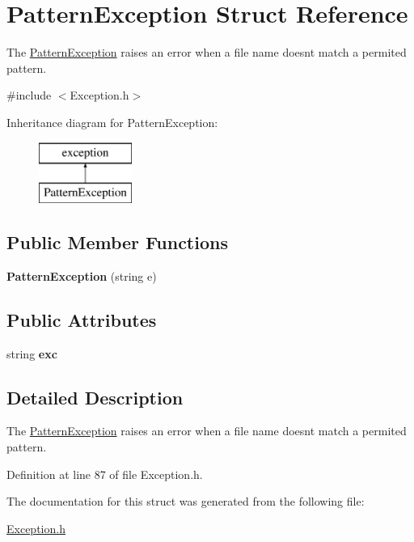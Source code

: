 \hypertarget{struct_pattern_exception}{}\section{Pattern\+Exception Struct Reference}
\label{struct_pattern_exception}


The \mbox{\hyperlink{struct_pattern_exception}{Pattern\+Exception}} raises an error when a file name doesn\textquotesingle{}t match a permited pattern.  




{\ttfamily \#include $<$Exception.\+h$>$}

Inheritance diagram for Pattern\+Exception\+:\begin{figure}[H]
\begin{center}
\leavevmode
\includegraphics[height=2.000000cm]{struct_pattern_exception}
\end{center}
\end{figure}
\subsection*{Public Member Functions}
\begin{DoxyCompactItemize}
\item 
\mbox{\label{struct_pattern_exception_a03cfed18c4e3e3c29068453671251f29}} 
{\bfseries Pattern\+Exception} (string e)
\end{DoxyCompactItemize}
\subsection*{Public Attributes}
\begin{DoxyCompactItemize}
\item 
\mbox{\label{struct_pattern_exception_adfd2d6ad911ccc6a71b395fe41a2a241}} 
string {\bfseries exc}
\end{DoxyCompactItemize}


\subsection{Detailed Description}
The \mbox{\hyperlink{struct_pattern_exception}{Pattern\+Exception}} raises an error when a file name doesn\textquotesingle{}t match a permited pattern. 

Definition at line 87 of file Exception.\+h.



The documentation for this struct was generated from the following file\+:\begin{DoxyCompactItemize}
\item 
\mbox{\hyperlink{_exception_8h}{Exception.\+h}}\end{DoxyCompactItemize}
